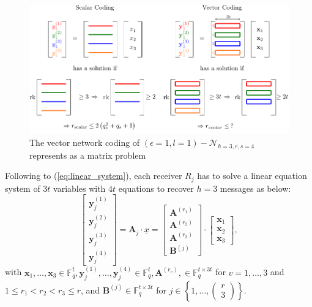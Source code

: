 \begin{figure}[H]
\caption{The vector network coding of $(\epsilon=1,l=1)-\mathcal{N}_{h=3,r,s=4}$
represents as a matrix problem \label{fig:rk_h3}}

\centering{}\includegraphics[width=0.6\paperwidth]{./figures/rk_h3}
\end{figure}

Following to (\ref{eq:linear_system}), each receiver $R_{j}$ has
to solve a linear equation system of $3t$ variables with $4t$ equations
to recover $h=3$ messages as below:
\begin{equation}
\left[\begin{array}{c}
\boldsymbol{y}_{j}^{\left(1\right)}\\
\boldsymbol{y}_{j}^{\left(2\right)}\\
\boldsymbol{y}_{j}^{\left(3\right)}\\
\boldsymbol{y}_{j}^{\left(4\right)}
\end{array}\right]=\boldsymbol{A}_{j}\cdot\underline{x}=\left[\begin{array}{c}
\boldsymbol{A}^{\left(r_{1}\right)}\\
\boldsymbol{A}^{\left(r_{2}\right)}\\
\boldsymbol{A}^{\left(r_{3}\right)}\\
\boldsymbol{B}^{\left(j\right)}
\end{array}\right]\cdot\left[\begin{array}{c}
\boldsymbol{x}_{1}\\
\boldsymbol{x}_{2}\\
\boldsymbol{x}_{3}
\end{array}\right],\label{eq:linear_system_h3rs4}
\end{equation}
with $\boldsymbol{x}_{1},\ldots,\boldsymbol{x}_{3}\in\ensuremath{\mathbb{F}}_{q}^{t},\boldsymbol{y}_{j}^{\left(1\right)},\ldots,\boldsymbol{y}_{j}^{\left(4\right)}\in\ensuremath{\mathbb{F}}_{q}^{t},\boldsymbol{A}^{\left(r_{v}\right)},\in\ensuremath{\mathbb{F}}_{q}^{t\times3t}$
for $v=1,\ldots,3$ and $1\leq r_{1}<r_{2}<r_{3}\leq r$, and $\boldsymbol{B}^{\left(j\right)}\in\ensuremath{\mathbb{F}}_{q}^{t\times3t}$
for $j\in\left\{ 1,\ldots,\left(\begin{array}{c}
r\\
3
\end{array}\right)\right\} $.

